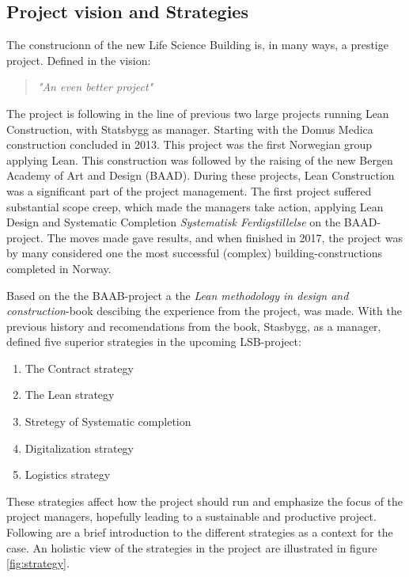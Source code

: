 \subsection{Project vision and Strategies}
The construcionn of the new Life Science Building is, in many ways, a prestige project. Defined in the vision:
\begin{quotation}
    \textit{"An even better project"}
\end{quotation}
The project is following in the line of previous two large projects running Lean Construction, with Statsbygg as manager. Starting with the Domus Medica construction concluded in 2013. This project was the first Norwegian group applying Lean. This construction was followed by the raising of the new Bergen Academy of Art and Design (BAAD). During these projects, Lean Construction was a significant part of the project management. The first project suffered substantial scope creep, which made the managers take action, applying Lean Design and Systematic Completion \textit{Systematisk Ferdigstillelse} on the BAAD-project. The moves made gave results, and when finished in 2017, the project was by many considered one the most successful (complex) building-constructions completed in Norway.

Based on the the BAAB-project a the \textit{Lean methodology in design and construction}-book \cite{lean_i_praksis} descibing the experience from the project, was made. With the previous history and recomendations from the book, Stasbygg, as a manager, defined five superior strategies in the upcoming LSB-project: 
\begin{enumerate}
    \item The Contract strategy
    \item The Lean strategy
    \item Stretegy of Systematic completion
    \item Digitalization strategy
    \item Logistics strategy
\end{enumerate}
These strategies affect how the project should run and emphasize the focus of the project managers, hopefully leading to a sustainable and productive project. Following are a brief introduction to the different strategies as a context for the case. An holistic view of the strategies in the project are illustrated in figure \ref{fig:strategy}.

